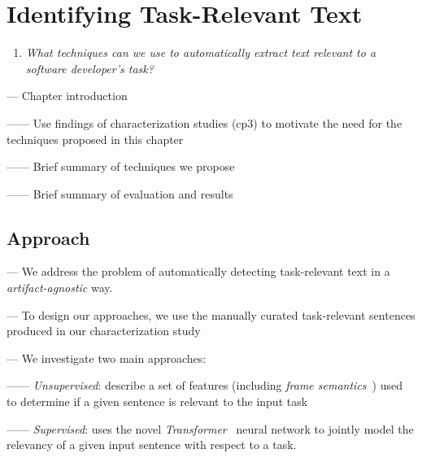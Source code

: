 \setcounter{chapter}{3}
\setcounter{rq}{1}


\chapter{Identifying Task-Relevant Text}
\label{ch:identifying}



\vspace{1mm}

\begin{enumerate}[label=\textit{RQ\arabic*},leftmargin=1.4cm]

\item \textit{What techniques can we use to automatically extract text relevant to a software developer's task?} 

\end{enumerate}

\vspace{1mm}

--- Chapter introduction 

------ Use findings of characterization studies (cp3) to motivate the need for the techniques proposed in this chapter

------ Brief summary of techniques we propose

------ Brief summary of evaluation and results



\section{Approach}

--- We address the problem of automatically detecting task-relevant text in a \textit{artifact-agnostic} way. \vspace{3mm}

--- To design our approaches, we use the manually curated task-relevant sentences produced in our characterization study~\cite{marques2020} \vspace{3mm}

--- We investigate two main approaches:

------ \textit{Unsupervised}: describe a set of features (including \textit{frame semantics}~\cite{fillmore1976frame}) used to determine if a given sentence is relevant to the input task

------ \textit{Supervised}: uses the novel \textit{Transformer}~\cite{Vaswani2017attention} neural network to jointly model the relevancy of a given input sentence with respect to a task. 


